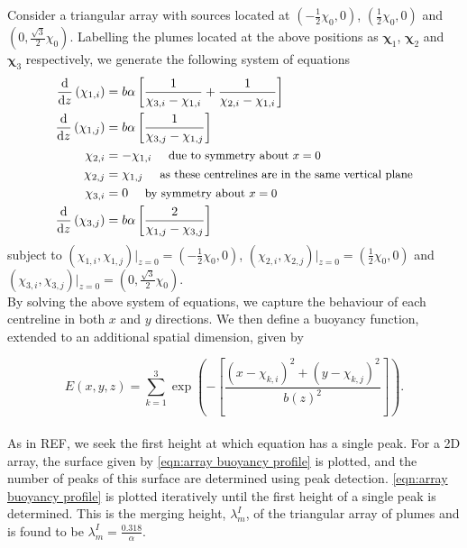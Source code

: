\documentclass{jfm}
\newcommand{\dbyd}[2]{\dfrac{\mathrm{d} #1}{\mathrm{d}#2}} %
\begin{document}
	\noindent Consider a triangular array with sources located at $\left(-\frac{1}{2}\chi_0,0\right)$, $\left(\frac{1}{2}\chi_0,0\right)$ and $\left(0,\frac{\sqrt{3}}{2}\chi_0\right)$. Labelling the plumes located at the above positions as $\mathbf{\chi}_1$, $\mathbf{\chi}_2$ and $\mathbf{\chi}_3$ respectively, we generate the following system of equations
	\begin{align}
		\dbyd{}{z} \left(\chi_{1,i}\right) &= b\alpha \left[\frac{1}{\chi_{3,i} - \chi_{1,i}} + \frac{1}{\chi_{2,i}-\chi_{1,i}} \right] \\
		\dbyd{}{z} \left(\chi_{1,j}\right) &= b\alpha \left[\frac{1}{\chi_{3,j}-\chi_{1,j}}\right] \\
		\chi_{2,i} &= -\chi_{1,i} \quad\text{\small due to symmetry about $x = 0$}\\
		\chi_{2,j} &= \chi_{1,j} \quad\text{\small as these centrelines are in the same vertical plane}\\
		\chi_{3,i} &= 0 \quad \text{\small by symmetry about $x = 0$}\\
		\dbyd{}{z}\left(\chi_{3,j}\right) &= b\alpha\left[\frac{2}{\chi_{1,j}-\chi_{3,j}}\right]
	\end{align}
	subject to $\left(\chi_{1,i},\chi_{1,j}\right)\vert_{z=0} = \left(-\frac{1}{2}\chi_0,0\right)$, $\left(\chi_{2,i},\chi_{2,j}\right)\vert_{z=0} = \left(\frac{1}{2}\chi_0,0\right)$ and $\left(\chi_{3,i},\chi_{3,j}\right)\vert_{z=0} = \left(0,\frac{\sqrt{3}}{2}\chi_0\right)$. \\
		
	\noindent By solving the above system of equations, we capture the behaviour of each centreline in both $x$ and $y$ directions. We then define a buoyancy function, extended to an additional spatial dimension, given by
	
	\begin{equation}
		E(x,y,z) = \sum_{k=1}^{3} \exp\left(- \left[\frac{(x - \chi_{k,i})^2 + (y - \chi_{k,j})^2}{b(z)^2}\right]\right). \label{eqn:array buoyancy profile}
	\end{equation}
	\\
	\noindent As in REF, we seek the first height at which equation has a single peak. For a 2D array, the surface given by \eqref{eqn:array buoyancy profile} is plotted, and the number of peaks of this surface are determined using peak detection. \eqref{eqn:array buoyancy profile} is plotted iteratively until the first height of a single peak is determined. This is the merging height, $\lambda_m^I$, of the triangular array of plumes and is found to be $\lambda_m^I = \frac{0.318}{\alpha}$.
\end{document}
